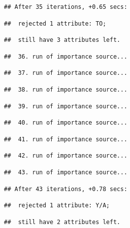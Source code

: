 \documentclass[
]{article}
\begin{document}
\begin{verbatim}
## After 35 iterations, +0.65 secs:
\end{verbatim}

\begin{verbatim}
##  rejected 1 attribute: TO;
\end{verbatim}

\begin{verbatim}
##  still have 3 attributes left.
\end{verbatim}

\begin{verbatim}
##  36. run of importance source...
\end{verbatim}

\begin{verbatim}
##  37. run of importance source...
\end{verbatim}

\begin{verbatim}
##  38. run of importance source...
\end{verbatim}

\begin{verbatim}
##  39. run of importance source...
\end{verbatim}

\begin{verbatim}
##  40. run of importance source...
\end{verbatim}

\begin{verbatim}
##  41. run of importance source...
\end{verbatim}

\begin{verbatim}
##  42. run of importance source...
\end{verbatim}

\begin{verbatim}
##  43. run of importance source...
\end{verbatim}

\begin{verbatim}
## After 43 iterations, +0.78 secs:
\end{verbatim}

\begin{verbatim}
##  rejected 1 attribute: Y/A;
\end{verbatim}

\begin{verbatim}
##  still have 2 attributes left.
\end{verbatim}
\end{document}
